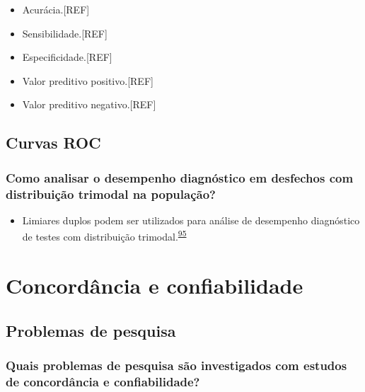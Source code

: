 \documentclass[
]{book}
\providecommand{\tightlist}{%
  \setlength{\itemsep}{0pt}\setlength{\parskip}{0pt}}
\begin{document}
\begin{itemize}
\item
  Acurácia.{[}REF{]}
\item
  Sensibilidade.{[}REF{]}
\item
  Especificidade.{[}REF{]}
\item
  Valor preditivo positivo.{[}REF{]}
\item
  Valor preditivo negativo.{[}REF{]}
\end{itemize}

\hypertarget{curvas-roc}{%
\section{Curvas ROC}\label{curvas-roc}}

\hypertarget{como-analisar-o-desempenho-diagnuxf3stico-em-desfechos-com-distribuiuxe7uxe3o-trimodal-na-populauxe7uxe3o}{%
\subsection{Como analisar o desempenho diagnóstico em desfechos com distribuição trimodal na população?}\label{como-analisar-o-desempenho-diagnuxf3stico-em-desfechos-com-distribuiuxe7uxe3o-trimodal-na-populauxe7uxe3o}}

\begin{itemize}
\tightlist
\item
  Limiares duplos podem ser utilizados para análise de desempenho diagnóstico de testes com distribuição trimodal.\textsuperscript{\protect\hyperlink{ref-ferreira2021}{95}}
\end{itemize}

\hypertarget{analise-concordancia-confiabilidade}{%
\chapter{\texorpdfstring{\textbf{Concordância e confiabilidade}}{Concordância e confiabilidade}}\label{analise-concordancia-confiabilidade}}

\hypertarget{problemas}{%
\section{Problemas de pesquisa}\label{problemas}}

\hypertarget{quais-problemas-de-pesquisa-suxe3o-investigados-com-estudos-de-concorduxe2ncia-e-confiabilidade}{%
\subsection{Quais problemas de pesquisa são investigados com estudos de concordância e confiabilidade?}\label{quais-problemas-de-pesquisa-suxe3o-investigados-com-estudos-de-concorduxe2ncia-e-confiabilidade}}
\end{document}

